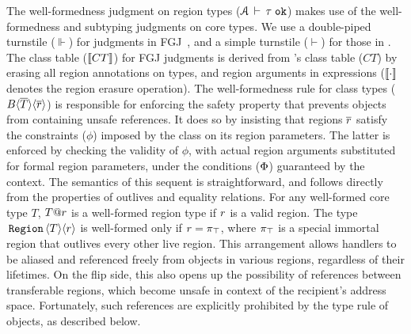 \noindent The well-formedness judgment on region types
(${\mathcal{A}}\,\vdash\,\tau \; \texttt{ok}$) makes use of the well-formedness and subtyping
judgments on core types. We use a double-piped turnstile ($\Vdash$)
for judgments in FGJ~\cite{fgj}, and a simple turnstile ($\vdash$) for
those in \FB. The class table ($\llbracket CT \rrbracket$) for FGJ judgments is
derived from \FB's class table ($CT$) by erasing all region
annotations on types, and region arguments in expressions
($\llbracket \cdot \rrbracket$ denotes the region erasure operation). 
The well-formedness rule for class types
($B\langle \overline{T} \rangle\langle \overline{r} \rangle$) is responsible for enforcing the
safety property that prevents objects from containing unsafe
references. It does so by insisting that regions $\overline{r}$ satisfy the
constraints ($\phi$) imposed by the class on its region parameters.
The latter is enforced by checking the validity of $\phi$, with actual
region arguments substituted for formal region parameters, under the
conditions ($\Phi$) guaranteed by the context. The semantics of this
sequent is straightforward, and follows directly from the properties
of outlives and equality relations. For any well-formed core type $T$,
$T@r$ is a well-formed region type if $r$ is a valid region.
The type $\,{\tt Region}\,\langle T \rangle\langle r \rangle$ is well-formed only if $r = \pi_{\top}$, where
$\pi_{\top}$ is a special immortal region that outlives every other live
region. This arrangement allows \C{\RgnZ} handlers to be aliased and
referenced freely from objects in various regions, regardless of their
lifetimes. On the flip side, this also opens up the possibility of
references between transferable regions, which become unsafe in
context of the recipient's address space. Fortunately, such references
are explicitly prohibited by the type rule of \C{\RgnZ} objects, as
described below.


